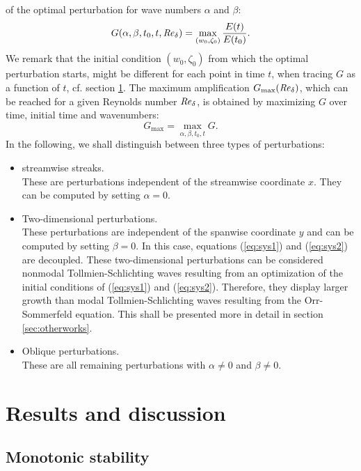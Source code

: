 \documentclass{jfm}
\newcommand\be{\begin{equation}}
\newcommand\ee{\end{equation}}
\newcommand\Rey{\mbox{\textit{Re}}}  %
\begin{document}
of the optimal perturbation for wave numbers $ \alpha $ and $ \beta$:
\be
G(\alpha,\beta,t_0,t,\Rey_\delta) = \max_{ (w_0,\zeta_0) } \frac{ E(t) }{E(t_0) }. \label{eq:amplification}
\ee
We remark that the initial condition $ (w_0,\zeta_0 ) $
from which the optimal perturbation starts,
might be different for each point in time $ t $,
when tracing $ G $ as a function of $ t $, cf. section \ref{sec:results}.
The maximum amplification $ G_{\max}(\Rey_\delta)$, which can be reached
for a given Reynolds number $ \Rey_\delta $, is obtained by
maximizing $ G$ over time, initial time and wavenumbers:
\be
G_{\max} = \max_{\alpha,\beta,t_0,t} G. \label{eq:maximumA}
\ee
In the following, we shall distinguish between three types of perturbations:
\vspace{2mm}
\begin{itemize}
\item streamwise streaks.\\
These are perturbations independent of the streamwise coordinate $ x$. They
can be computed by setting $ \alpha = 0 $. 
\item Two-dimensional perturbations.\\
These perturbations are independent of the spanwise coordinate $ y $ and
can be computed by setting $ \beta = 0 $. In this case,
equations (\ref{eq:sys1}) and (\ref{eq:sys2}) are decoupled. These
two-dimensional perturbations can be considered nonmodal
Tollmien-Schlichting waves resulting from an optimization of the
initial conditions of (\ref{eq:sys1}) and (\ref{eq:sys2}). Therefore,
they display larger growth than modal Tollmien-Schlichting waves
resulting from the Orr-Sommerfeld equation. This shall be presented more
in detail in section \ref{sec:otherworks}. 
\item Oblique perturbations.\\
These are all remaining perturbations with $ \alpha \neq 0 $ and
$ \beta \neq 0 $. 
\end{itemize}
\vspace{2mm}


\section{Results and discussion} \label{sec:results}

\subsection{Monotonic stability} \label{sec:absoluteStability}
\end{document}
